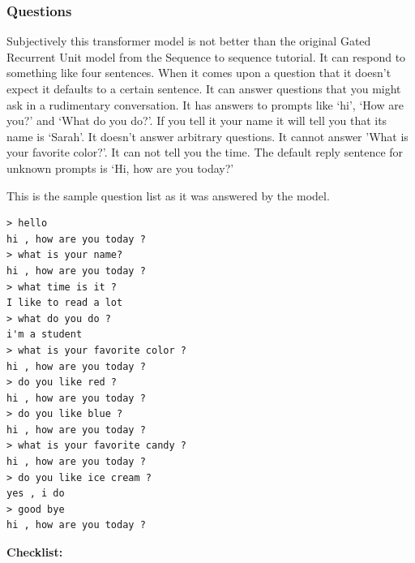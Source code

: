 
\subsubsection*{Questions}
Subjectively this transformer model is not better than the original Gated Recurrent Unit model from the Sequence to sequence tutorial. It can respond to something like four sentences. When it comes upon a question that it doesn't expect it defaults to a certain sentence. It can answer questions that you might ask in a rudimentary conversation. It has answers to prompts like `hi', `How are you?' and `What do you do?'. If you tell it your name it will tell you that its name is `Sarah'. It doesn't answer arbitrary questions. It cannot answer 'What is your favorite color?'. It can not tell you the time. The default reply sentence for unknown prompts is `Hi, how are you today?'

This is the sample question list as it was answered by the model.

\begin{verbatim}
> hello
hi , how are you today ?
> what is your name?
hi , how are you today ?
> what time is it ?
I like to read a lot
> what do you do ?
i'm a student
> what is your favorite color ?
hi , how are you today ?
> do you like red ?
hi , how are you today ?
> do you like blue ?
hi , how are you today ?
> what is your favorite candy ?
hi , how are you today ?
> do you like ice cream ?
yes , i do 
> good bye
hi , how are you today ?
\end{verbatim}

\noindent \textbf{Checklist:} 

